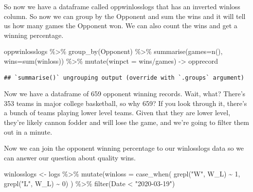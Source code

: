 \documentclass[
]{book}
\newenvironment{Shaded}{\begin{snugshade}}{\end{snugshade}}
\newcommand{\AttributeTok}[1]{\textcolor[rgb]{0.77,0.63,0.00}{#1}}
\newcommand{\DecValTok}[1]{\textcolor[rgb]{0.00,0.00,0.81}{#1}}
\newcommand{\FunctionTok}[1]{\textcolor[rgb]{0.00,0.00,0.00}{#1}}
\newcommand{\NormalTok}[1]{#1}
\newcommand{\OtherTok}[1]{\textcolor[rgb]{0.56,0.35,0.01}{#1}}
\newcommand{\SpecialCharTok}[1]{\textcolor[rgb]{0.00,0.00,0.00}{#1}}
\newcommand{\StringTok}[1]{\textcolor[rgb]{0.31,0.60,0.02}{#1}}
\begin{document}
So now we have a dataframe called oppwinlosslogs that has an inverted winloss column. So now we can group by the Opponent and sum the wins and it will tell us how many games the Opponent won. We can also count the wins and get a winning percentage.

\begin{Shaded}
\begin{Highlighting}[]
\NormalTok{oppwinlosslogs }\SpecialCharTok{\%\textgreater{}\%} \FunctionTok{group\_by}\NormalTok{(Opponent) }\SpecialCharTok{\%\textgreater{}\%} \FunctionTok{summarise}\NormalTok{(}\AttributeTok{games=}\FunctionTok{n}\NormalTok{(), }\AttributeTok{wins=}\FunctionTok{sum}\NormalTok{(winloss)) }\SpecialCharTok{\%\textgreater{}\%} \FunctionTok{mutate}\NormalTok{(}\AttributeTok{winpct =}\NormalTok{ wins}\SpecialCharTok{/}\NormalTok{games) }\OtherTok{{-}\textgreater{}}\NormalTok{ opprecord}
\end{Highlighting}
\end{Shaded}

\begin{verbatim}
## `summarise()` ungrouping output (override with `.groups` argument)
\end{verbatim}

Now we have a dataframe of 659 opponent winning records. Wait, what? There's 353 teams in major college basketball, so why 659? If you look through it, there's a bunch of teams playing lower level teams. Given that they are lower level, they're likely cannon fodder and will lose the game, and we're going to filter them out in a minute.

Now we can join the opponent winning percentage to our winlosslogs data so we can answer our question about quality wins.

\begin{Shaded}
\begin{Highlighting}[]
\NormalTok{winlosslogs }\OtherTok{\textless{}{-}}\NormalTok{ logs }\SpecialCharTok{\%\textgreater{}\%} \FunctionTok{mutate}\NormalTok{(}\AttributeTok{winloss =} \FunctionTok{case\_when}\NormalTok{(}
  \FunctionTok{grepl}\NormalTok{(}\StringTok{"W"}\NormalTok{, W\_L) }\SpecialCharTok{\textasciitilde{}} \DecValTok{1}\NormalTok{, }
  \FunctionTok{grepl}\NormalTok{(}\StringTok{"L"}\NormalTok{, W\_L) }\SpecialCharTok{\textasciitilde{}} \DecValTok{0}\NormalTok{)}
\NormalTok{) }\SpecialCharTok{\%\textgreater{}\%} \FunctionTok{filter}\NormalTok{(Date }\SpecialCharTok{\textless{}} \StringTok{"2020{-}03{-}19"}\NormalTok{)}
\end{Highlighting}
\end{Shaded}
\end{document}
